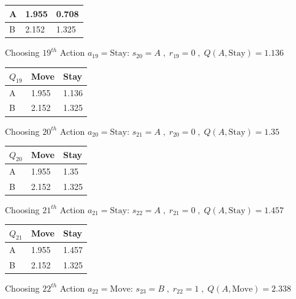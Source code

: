 \documentclass[a4paper]{article}
\theoremstyle{definition}
\newenvironment{soln}{
    \leavevmode\color{blue}\ignorespaces
}{}
\begin{document}
\begin{enumerate}
\begin{soln}
\begin{center}
\begin{tabular}{ | m{5em} | m{5em}| m{5em} |}
            A & 1.955 & 0.708  \\
            \hline
            B & 2.152 & 1.325 \\ 
            \hline
            \end{tabular}
        \end{center}
Choosing $19^{th}$ Action $a_{19} = \text{Stay}$: $s_{20}=A\;,\;r_{19}=0\;,\;Q(A,\text{Stay}) = 1.136$
        \begin{center}
            \begin{tabular}{ | m{5em} | m{5em}| m{5em} |} 
            \hline
            $Q_{19}$ & Move & Stay \\ 
            \hline
            A & 1.955 & 1.136  \\
            \hline
            B & 2.152 & 1.325 \\ 
            \hline
            \end{tabular}
        \end{center}
Choosing $20^{th}$ Action $a_{20} = \text{Stay}$: $s_{21}=A\;,\;r_{20}=0\;,\;Q(A,\text{Stay}) = 1.35$
        \begin{center}
            \begin{tabular}{ | m{5em} | m{5em}| m{5em} |} 
            \hline
            $Q_{20}$ & Move & Stay \\ 
            \hline
            A & 1.955 & 1.35  \\
            \hline
            B & 2.152 & 1.325 \\ 
            \hline
            \end{tabular}
        \end{center}
Choosing $21^{th}$ Action $a_{21} = \text{Stay}$: $s_{22}=A\;,\;r_{21}=0\;,\;Q(A,\text{Stay}) = 1.457$
        \begin{center}
            \begin{tabular}{ | m{5em} | m{5em}| m{5em} |} 
            \hline
            $Q_{21}$ & Move & Stay \\ 
            \hline
            A & 1.955 & 1.457  \\
            \hline
            B & 2.152 & 1.325 \\ 
            \hline
            \end{tabular}
        \end{center}
Choosing $22^{th}$ Action $a_{22} = \text{Move}$: $s_{23}=B\;,\;r_{22}=1\;,\;Q(A,\text{Move}) = 2.338$
        \begin{center}
            \begin{tabular}{ | m{5em} | m{5em}| m{5em} |} 

\end{tabular}
\end{center}
\end{soln}
\end{enumerate}
\end{document}
